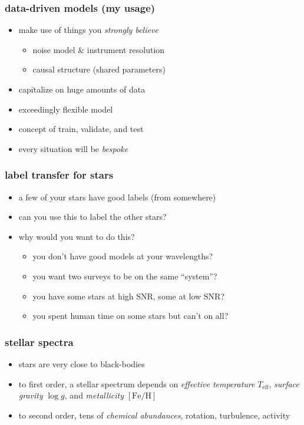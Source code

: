 \documentclass[pdftex]{beamer}
\newcommand{\teff}{T_{\mathrm{eff}}}
\newcommand{\logg}{\log g}
\newcommand{\feh}{[\mathrm{Fe / H}]}
\begin{document}
\begin{frame}
  \frametitle{data-driven models (my usage)}
  \begin{itemize}
  \item make use of things you \emph{strongly believe}
    \begin{itemize}
    \item noise model \& instrument resolution
    \item causal structure (shared parameters)
    \end{itemize}
  \item capitalize on huge amounts of data
  \item exceedingly flexible model
  \item concept of train, validate, and test
  \item every situation will be \emph{bespoke}
  \end{itemize}
\end{frame}

\begin{frame}
  \frametitle{label transfer for stars}
  \begin{itemize}
  \item a few of your stars have good labels (from somewhere)
  \item can you use this to label the other stars?
  \item why would you want to do this?
    \begin{itemize}
    \item<2> you don't have good models at your wavelengths?
    \item<2> you want two surveys to be on the same ``system''?
    \item<2> you have some stars at high SNR, some at low SNR?
    \item<2> you spent human time on some stars but can't on all?
    \end{itemize}
  \end{itemize}
\end{frame}

\begin{frame}
  \frametitle{stellar spectra}
  \begin{itemize}
  \item<1-> stars are very close to black-bodies
  \item<1-> to first order, a stellar spectrum depends on \emph{effective temperature} $\teff$, \emph{surface gravity} $\logg$, and \emph{metallicity} $\feh$
  \item<2> to second order, tens of \emph{chemical abundances}, rotation, turbulence, activity
  \end{itemize}
\end{frame}
\end{document}
